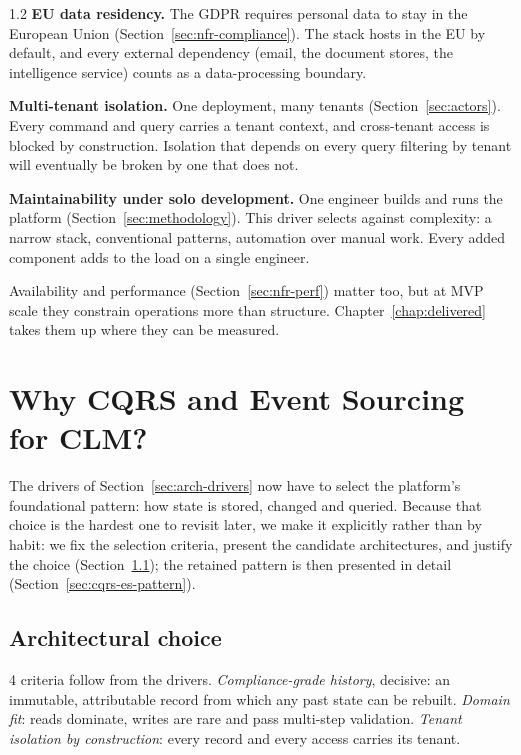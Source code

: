 \begin{spacing}{1.2}
\textbf{EU data residency.} The GDPR requires personal data to stay in the
European Union (Section~\ref{sec:nfr-compliance}). The stack hosts in the EU
by default, and every external dependency (email, the document stores, the
intelligence service) counts as a data-processing boundary.

\textbf{Multi-tenant isolation.} One deployment, many tenants
(Section~\ref{sec:actors}). Every command and query carries a tenant
context, and cross-tenant access is blocked by construction. Isolation that
depends on every query filtering by tenant will eventually be broken by one that does not.

\textbf{Maintainability under solo development.} One engineer builds and
runs the platform (Section~\ref{sec:methodology}). This driver selects
against complexity: a narrow stack, conventional patterns, automation over
manual work. Every added component adds to the load on a single engineer.

Availability and performance (Section~\ref{sec:nfr-perf}) matter too, but at
MVP scale they constrain operations more than structure.
Chapter~\ref{chap:delivered} takes them up where they can be measured.

\section{Why CQRS and Event Sourcing for CLM?}
\label{sec:why-cqrs-es}

The drivers of Section~\ref{sec:arch-drivers} now have to select the
platform's foundational pattern: how state is stored, changed and queried.
Because that choice is the hardest one to revisit later, we make it
explicitly rather than by habit: we fix the selection criteria, present
the candidate architectures, and justify the choice
(Section~\ref{sec:arch-choice}); the retained pattern is then presented in
detail (Section~\ref{sec:cqrs-es-pattern}).

\subsection{Architectural choice}
\label{sec:arch-choice}

4 criteria follow from the drivers. \emph{Compliance-grade history},
decisive: an immutable, attributable record from which any past state can be
rebuilt. \emph{Domain fit}: reads dominate, writes are rare and pass
multi-step validation. \emph{Tenant isolation by construction}: every record
and every access carries its tenant.


\end{spacing}
